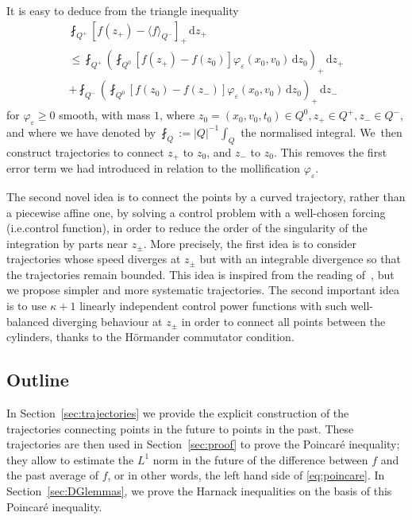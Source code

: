 \documentclass[10pt,a4paper]{amsart}
\providecommand{\ie}{i.e.}
\theoremstyle{definition}
\newcommand{\dd}{{\, \mathrm d}}
\let\var\varepsilon
\begin{document}
It is easy to deduce from the triangle inequality\vspace*{-5pt}
\begin{multline}\label{eq:split-Q0}
\fint_{Q^+} \left[ f(z_+) - \langle f \rangle_{Q^-} \right]_+ \dd z_+\\[-5pt]
\le
\fint_{Q^+} \left(\fint_{Q^0} \left[ f(z_+) -
f(z_0) \right] \varphi_\var(x_0, v_0)\dd z_0 \right)_+ \dd z_+ \\[-5pt]
+ \fint_{Q^-} \left(\fint_{Q^0} \left[ f(z_0) -
f(z_-) \right]\varphi_\var(x_0, v_0) \dd z_0 \right)_+ \dd z_-
\end{multline}
for $\varphi_\var \ge 0$ smooth, with mass $1$, where
$z_0=(x_0,v_0,t_0) \in Q^0, z_+ \in Q^+, z_- \in Q^-$, and where
we have denoted by $\fint_{Q} := |Q|^{-1} \int_Q$ the normalised
integral. We~then construct trajectories to connect $z_+$ to
$z_0$, and $z_-$ to $z_0$. This removes the first error term we
had introduced in relation to the mollification $\varphi_\var$.

The second novel idea is to connect the points by a curved
trajectory, rather than a piecewise affine one, by solving a
control problem with a well-chosen forcing (\ie control
function), in order to reduce the order of the singularity of the
integration by parts near $z_{\pm}$. More precisely, the first
idea is to consider trajectories whose speed diverges at
$z_{\pm}$ but with an integrable divergence so that the
trajectories remain bounded. This idea is inspired from the
reading of~\cite{niebel2022kinetic}, but we propose simpler and
more systematic trajectories. The second important idea is to use
$\kappa+1$ linearly independent control power functions with such
well-balanced diverging behaviour at $z_{\pm}$ in order to
connect all points between the cylinders, thanks to the Hörmander
commutator condition.

\subsection{Outline}

In Section~\ref{sec:trajectories} we provide the explicit construction
of the trajectories connecting points in the future to points in
the past. These trajectories are then used in
Section~\ref{sec:proof} to prove the Poincaré inequality; they
allow to estimate the $L^1$ norm in the future of the difference
between $f$ and the past average of $f$, or in other words, the
left hand side of \eqref{eq:poincare}. In Section~\ref{sec:DGlemmas}, we
prove the Harnack inequalities on the basis of this Poincaré
inequality.
\end{document}
